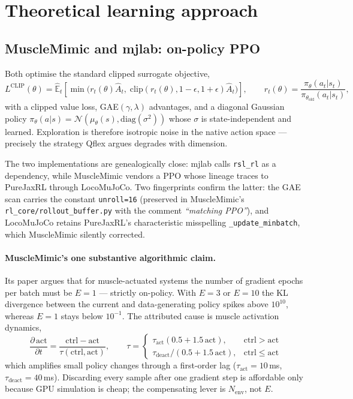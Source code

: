 \documentclass[11pt,a4paper]{article}
\begin{document}
\section{Theoretical learning approach}

\subsection{MuscleMimic and mjlab: on-policy PPO}

Both optimise the standard clipped surrogate objective,
\begin{equation}
L^{\text{CLIP}}(\theta) = \hat{\mathbb{E}}_t\!\left[\min\!\big(r_t(\theta)\hat{A}_t,\;
\mathrm{clip}(r_t(\theta), 1-\epsilon, 1+\epsilon)\hat{A}_t\big)\right],
\qquad r_t(\theta) = \frac{\pi_\theta(a_t|s_t)}{\pi_{\theta_{\text{old}}}(a_t|s_t)},
\end{equation}
with a clipped value loss, GAE$(\gamma,\lambda)$ advantages, and a diagonal Gaussian
policy $\pi_\theta(a|s) = \mathcal{N}(\mu_\theta(s), \mathrm{diag}(\sigma^2))$ whose
$\sigma$ is state-independent and learned. Exploration is therefore isotropic noise in
the native action space --- precisely the strategy Qflex argues degrades with dimension.

The two implementations are genealogically close: mjlab calls \texttt{rsl\_rl} as a
dependency, while MuscleMimic vendors a PPO whose lineage traces to PureJaxRL through
LocoMuJoCo. Two fingerprints confirm the latter: the GAE scan carries the constant
\texttt{unroll=16} (preserved in MuscleMimic's \texttt{rl\_core/rollout\_buffer.py} with
the comment \emph{``matching PPO''}), and LocoMuJoCo retains PureJaxRL's characteristic
misspelling \texttt{\_update\_minbatch}, which MuscleMimic silently corrected.

\paragraph{MuscleMimic's one substantive algorithmic claim.}
Its paper argues that for muscle-actuated systems the number of gradient epochs per batch
must be $E=1$ --- strictly on-policy. With $E=3$ or $E=10$ the KL divergence between the
current and data-generating policy spikes above $10^{10}$, whereas $E=1$ stays below
$10^{-1}$. The attributed cause is muscle activation dynamics,
\begin{equation}
\frac{\partial\,\mathrm{act}}{\partial t} = \frac{\mathrm{ctrl}-\mathrm{act}}{\tau(\mathrm{ctrl},\mathrm{act})},
\qquad
\tau = \begin{cases}
\tau_{\text{act}}(0.5 + 1.5\,\mathrm{act}), & \mathrm{ctrl} > \mathrm{act}\\
\tau_{\text{deact}}/(0.5 + 1.5\,\mathrm{act}), & \mathrm{ctrl} \le \mathrm{act}
\end{cases}
\end{equation}
which amplifies small policy changes through a first-order lag
($\tau_{\text{act}}=10$\,ms, $\tau_{\text{deact}}=40$\,ms). Discarding every sample after
one gradient step is affordable only because GPU simulation is cheap; the compensating
lever is $N_{\text{env}}$, not $E$.
\end{document}
